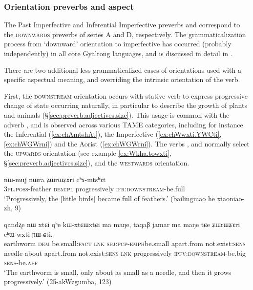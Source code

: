 \subsubsection{Orientation preverbs and aspect} \label{sec:orientation.preverb.aspect}
The Past Imperfective and Inferential Imperfective preverbs  and  correspond to the \textsc{downwards} preverbs of series A and D, respectively. The grammaticalization process from `downward' orientation to imperfective has occurred (probably independently) in all core Gyalrong languages, and is discussed in detail in \citet{lin11direction}.

There are two additional less grammaticalized cases of orientations used with a specific aspectual meaning, and overriding the intrinsic orientation of the verb.

First, the \textsc{downstream} orientation occurs with stative verb to express progressive change of state occurring naturally, in particular to describe the growth of plants and animals (§\ref{sec:preverb.adjectives.size}). This usage is common with the adverb , and is observed across various TAME categories, including for instance the Inferential (\ref{ex:chAmtshAt}), the Imperfective (\ref{ex:chWwxti.YWCti}, \ref{ex:chWGWrni}) and the Aorist (\ref{ex:chWGWrni}). The verbs , and  normally select the \textsc{upwards} orientation (see example \ref{ex:Wkha.towxti}, §\ref{sec:preverb.adjectives.size}), and  the \textsc{westwards} orientation.

\begin{exe}
\ex \label{ex:chAmtshAt}
\gll nɯ-muj nɯra ʑɯrɯʑɤri cʰɤ-mtsʰɤt   \\
 \textsc{3pl}.\textsc{poss}-feather \textsc{dem}:\textsc{pl} progressively \textsc{ifr}:\textsc{downstream}-be.full \\
\glt `Progressively, the [little birds] became full of feathers.' (bailingniao he xiaoniao-zh, 9)
\end{exe}

\begin{exe}
\ex \label{ex:chWwxti.YWCti}
\gll qandʐe nɯ xtɕi qʰe kɯ-xtɕɯ\redp{}xtɕi ma maŋe, taqaβ jamar ma maŋe tɕe ʑɯrɯʑɤri cʰɯ-wxti ɲɯ-ɕti. \\
earthworm \textsc{dem} be.small:\textsc{fact} \textsc{lnk} \textsc{sbj}:\textsc{pcp}-\textsc{emph}\redp{}be.small apart.from not.exist:\textsc{sens} needle about apart.from not.exist:\textsc{sens} \textsc{lnk} progressively \textsc{ipfv}:\textsc{downstream}-be.big \textsc{sens}-be.\textsc{aff} \\
\glt `The earthworm is small, only about as small as a needle, and then it grows progressively.' (25-akWzgumba, 123)
\end{exe}

